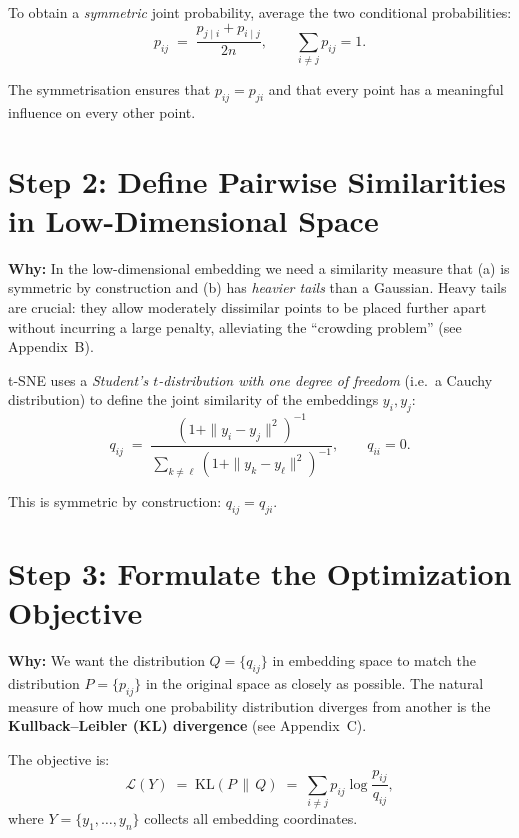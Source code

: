 \documentclass[11pt]{article}
\begin{document}
To obtain a \emph{symmetric} joint probability, average the two conditional
probabilities:
\[
  \boxed{p_{ij} \;=\; \frac{p_{j\mid i} + p_{i\mid j}}{2n}},
  \qquad \sum_{i \neq j} p_{ij} = 1.
\]

The symmetrisation ensures that $p_{ij} = p_{ji}$ and that every point has a
meaningful influence on every other point.

\section*{Step 2: Define Pairwise Similarities in Low-Dimensional Space}

\textbf{Why:} In the low-dimensional embedding we need a similarity measure that
(a) is symmetric by construction and (b) has \emph{heavier tails} than a
Gaussian. Heavy tails are crucial: they allow moderately dissimilar points to be
placed further apart without incurring a large penalty, alleviating the
``crowding problem'' (see Appendix~B).

t-SNE uses a \emph{Student's $t$-distribution with one degree of freedom}
(i.e.\ a Cauchy distribution) to define the joint similarity of the embeddings
$y_i, y_j$:
\[
  \boxed{q_{ij}
  \;=\;
  \frac{\left(1 + \|y_i - y_j\|^2\right)^{-1}}
       {\displaystyle\sum_{k \neq \ell}\left(1 + \|y_k - y_\ell\|^2\right)^{-1}}},
  \qquad q_{ii} = 0.
\]

This is symmetric by construction: $q_{ij} = q_{ji}$.

\section*{Step 3: Formulate the Optimization Objective}

\textbf{Why:} We want the distribution $Q = \{q_{ij}\}$ in embedding space to
match the distribution $P = \{p_{ij}\}$ in the original space as closely as
possible. The natural measure of how much one probability distribution diverges
from another is the \textbf{Kullback--Leibler (KL) divergence} (see Appendix~C).

The objective is:
\[
  \boxed{\mathcal{L}(Y)
  \;=\;
  \mathrm{KL}(P \,\|\, Q)
  \;=\;
  \sum_{i \neq j} p_{ij} \log \frac{p_{ij}}{q_{ij}}},
\]
where $Y = \{y_1, \dots, y_n\}$ collects all embedding coordinates.
\end{document}
